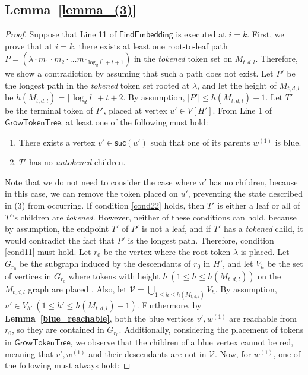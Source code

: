 \documentclass[runningheads]{llncs}
\theoremstyle{plain}
\theoremstyle{definition}
\begin{document}
\subsection{\textbf{Lemma~\ref{lemma_(3)}}}\label{appendix_D7}
\begin{proof}
    Suppose that Line 11 of $\mathsf{FindEmbedding}$ is executed at $i = k$. First, we prove that at $i = k$, there exists at least one root-to-leaf path $P = (\lambda \cdot m_1 \cdot m_2 \cdot \dots m_{\lceil \log_d l \rceil +t+1})$ in the \textit{tokened} token set on $M_{t, d, l}$. Therefore, we show a contradiction by assuming that such a path does not exist. Let $P'$ be the longest path in the \textit{tokened} token set rooted at $\lambda$, and let the height of $M_{t, d, l}$ be $h(M_{t, d, l}) = \lceil \log_d l \rceil +t+2$. By assumption, $|P'| \leq h(M_{t, d, l}) - 1$. Let $T'$ be the terminal token of $P'$, placed at vertex $u' \in V[H']$. From Line 1 of $\mathsf{GrowTokenTree}$, at least one of the following must hold:
    
    \begin{enumerate}
        \item There exists a vertex $v' \in \mathsf{suc}(u')$ such that one of its parents $w^{(1)}$ is blue. \label{cond11}
        \item $T'$ has no \textit{untokened} children. \label{cond22}
    \end{enumerate}
    
    Note that we do not need to consider the case where $u'$ has no children, because in this case, we can remove the token placed on $u'$, preventing the state described in (3) from occurring. If condition \ref{cond22} holds, then $T'$ is either a leaf or all of $T'$'s children are \textit{tokened}. However, neither of these conditions can hold, because by assumption, the endpoint $T'$ of $P'$ is not a leaf, and if $T'$ has a \textit{tokened} child, it would contradict the fact that $P'$ is the longest path. Therefore, condition \ref{cond11} must hold. Let $r_0$ be the vertex where the root token $\lambda$ is placed. Let $G_{r_0}$ be the subgraph induced by the descendants of $r_0$ in $H'$, and let $V_h$ be the set of vertices in $G_{r_0}$ where tokens with height $h\ (1 \leq h \leq h(M_{t, d, l}))$ on the $M_{t, d, l}$ graph are placed . Also, let $\mathcal{V} = \bigcup_{1 \leq h \leq h(M_{t, d, l})} V_h$. By assumption, $u' \in V_{h'}\ (1 \leq h' \leq h(M_{t, d, l})-1)$. Furthermore, by \textbf{Lemma~\ref{blue_reachable}}, both the blue vertices $v', w^{(1)}$ are reachable from $r_0$, so they are contained in $G_{r_0}$. Additionally, considering the placement of tokens in $\mathsf{GrowTokenTree}$, we observe that the children of a blue vertex cannot be red, meaning that $v', w^{(1)}$ and their descendants are not in $\mathcal{V}$. Now, for $w^{(1)}$, one of the following must always hold:


\end{proof}
\end{document}
